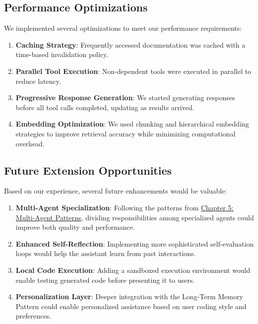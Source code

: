 \documentclass[11pt,oneside]{book}
\begin{document}
\subsection{Performance Optimizations}\label{performance-optimizations}

We implemented several optimizations to meet our performance
requirements:

\begin{enumerate}
\def\labelenumi{\arabic{enumi}.}
\item
  \textbf{Caching Strategy}: Frequently accessed documentation was
  cached with a time-based invalidation policy.
\item
  \textbf{Parallel Tool Execution}: Non-dependent tools were executed in
  parallel to reduce latency.
\item
  \textbf{Progressive Response Generation}: We started generating
  responses before all tool calls completed, updating as results
  arrived.
\item
  \textbf{Embedding Optimization}: We used chunking and hierarchical
  embedding strategies to improve retrieval accuracy while minimizing
  computational overhead.
\end{enumerate}

\subsection{Future Extension
Opportunities}\label{future-extension-opportunities}

Based on our experience, several future enhancements would be valuable:

\begin{enumerate}
\def\labelenumi{\arabic{enumi}.}
\item
  \textbf{Multi-Agent Specialization}: Following the patterns from
  \href{05_multi_agent_patterns.md}{Chapter 5: Multi-Agent Patterns},
  dividing responsibilities among specialized agents could improve both
  quality and performance.
\item
  \textbf{Enhanced Self-Reflection}: Implementing more sophisticated
  self-evaluation loops would help the assistant learn from past
  interactions.
\item
  \textbf{Local Code Execution}: Adding a sandboxed execution
  environment would enable testing generated code before presenting it
  to users.
\item
  \textbf{Personalization Layer}: Deeper integration with the Long-Term
  Memory Pattern could enable personalized assistance based on user
  coding style and preferences.
\end{enumerate}
\end{document}
